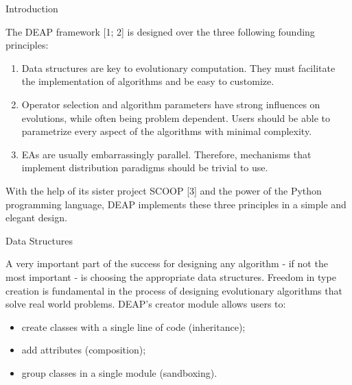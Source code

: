 Introduction

The DEAP framework [1; 2] is designed over the three following founding
principles:
\begin{enumerate}
\item 
Data structures are key to evolutionary computation. They must facilitate
the implementation of algorithms and be easy to customize.

\item 
Operator selection and algorithm parameters have strong influences
on evolutions, while often being problem dependent. Users should
be able to parametrize every aspect of the algorithms with minimal
complexity.

\item 
 EAs are usually embarrassingly parallel. Therefore, mechanisms
that implement distribution paradigms should be trivial to use.

\end{enumerate}

With the help of its sister project SCOOP [3] and the power of the Python
programming language, DEAP implements these three principles in a
simple and elegant design.


Data Structures

A very important part of the success for designing any algorithm - if
not the most important - is choosing the appropriate data structures.
Freedom in type creation is fundamental in the process of designing evolutionary
algorithms that solve real world problems. DEAP’s creator module
allows users to:
\begin{itemize}

\item 
create classes with a single line of code (inheritance);

\item 
add attributes (composition);

\item 
group classes in a single module (sandboxing).

\end{itemize}



